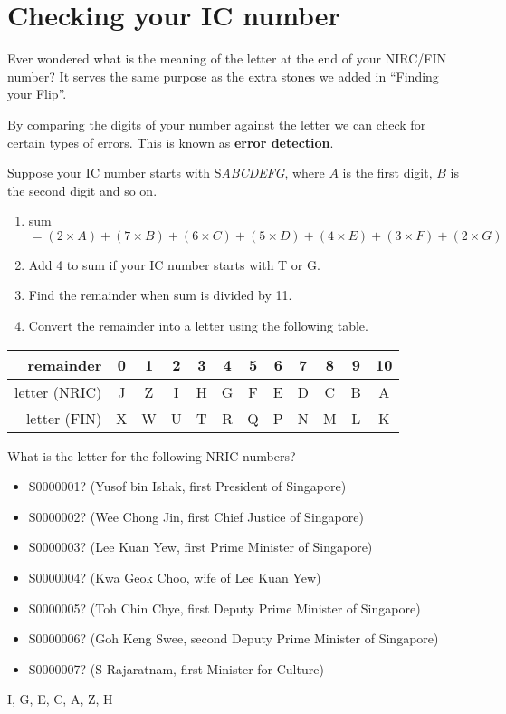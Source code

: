\documentclass[a4paper,12pt]{article}
\begin{document}
\newpage
\section*{Checking your IC number}
Ever wondered what is the meaning of the letter at the end of your NIRC/FIN
number? It serves the same purpose as the extra stones we added in
``Finding your Flip''.

By comparing the digits of your number against the letter we can check for
certain types of errors. This is known as \textbf{error detection}.

Suppose your IC number starts with S\emph{ABCDEFG}, where $A$ is the first
digit, $B$ is the second digit and so on.
\begin{enumerate}
    \item sum $= (2 \times A) +
                 (7 \times B) +
                 (6 \times C) +
                 (5 \times D) +
                 (4 \times E) +
                 (3 \times F) +
                 (2 \times G)$
    \item Add 4 to sum if your IC number starts with T or G.
    \item Find the remainder when sum is divided by 11.
    \item Convert the remainder into a letter using the following table.
\end{enumerate}

\begin{tabular}{r||ccccccccccc}
    remainder     & 0 & 1 & 2 & 3 & 4 & 5 & 6 & 7 & 8 & 9 & 10 \\ \hline
    letter (NRIC) & J & Z & I & H & G & F & E & D & C & B & A  \\
    letter (FIN)  & X & W & U & T & R & Q & P & N & M & L & K
\end{tabular}


\begin{question}[skip-below=0\baselineskip]
What is the letter for the following NRIC numbers?
\begin{itemize}
    \item S0000001? (Yusof bin Ishak, first President of Singapore)
    \item S0000002? (Wee Chong Jin, first Chief Justice of Singapore)
    \item S0000003? (Lee Kuan Yew, first Prime Minister of Singapore)
    \item S0000004? (Kwa Geok Choo, wife of Lee Kuan Yew)
    \item S0000005? (Toh Chin Chye, first Deputy Prime Minister of Singapore)
    \item S0000006? (Goh Keng Swee, second Deputy Prime Minister of Singapore)
    \item S0000007? (S Rajaratnam, first Minister for Culture)
\end{itemize}
\end{question}
\begin{solution}
I, G, E, C, A, Z, H
\end{solution}
\end{document}
